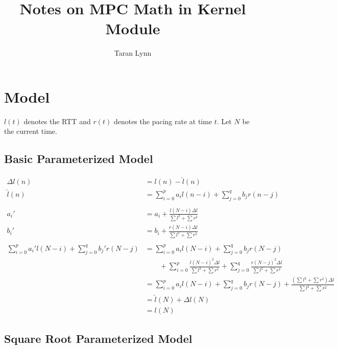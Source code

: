 \documentclass[12pt]{article}
\title{Notes on MPC Math in Kernel Module}
\author{Taran Lynn}
\begin{document}
\maketitle

\section{Model}

$l(t)$ denotes the RTT and $r(t)$ denotes the pacing rate at time $t$. Let $N$
be the current time.

\subsection{Basic Parameterized Model}

\begin{align*}
    \Delta{l}(n) &= l(n) - \hat{l}(n)\\
    \hat{l}(n) &= \sum_{i = 0}^p a_i l(n - i) + \sum_{j = 0}^q b_j r(n - j)\\
    \\
    a_i' &= a_i + \frac{l(N - i) \Delta{l}}{\sum l^2 + \sum r^2}\\
    b_i' &= b_i + \frac{r(N - i) \Delta{l}}{\sum l^2 + \sum r^2}\\
    \\
    \sum_{i = 0}^p a_i' l(N - i) + \sum_{j = 0}^q b_j' r(N - j) &=
    \sum_{i = 0}^p a_i l(N - i) + \sum_{j = 0}^q b_j r(N - j)\\
    &\qquad + \sum_{i = 0}^p \frac{l(N - i)^2 \Delta{l}}{\sum l^2 + \sum r^2}
    + \sum_{j = 0}^q \frac{r(N - j)^2 \Delta{l}}{\sum l^2 + \sum r^2}\\
    &= \sum_{i = 0}^p a_i l(N - i) + \sum_{j = 0}^q b_j r(N - j)
    + \frac{(\sum l^2 + \sum r^2) \Delta{l}}{\sum l^2 + \sum r^2}\\
    &= \hat{l}(N) + \Delta{l}(N)\\
    &= l(N)
\end{align*}

\pagebreak

\subsection{Square Root Parameterized Model}
\end{document}
